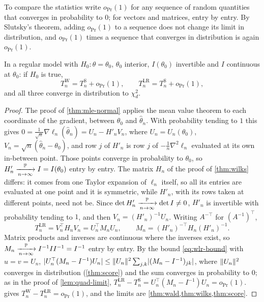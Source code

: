 To compare the statistics write $o_\Pr(1)$ for any sequence of random quantities that converges in probability to $0$; for vectors and matrices, entry by entry.
By Slutsky's theorem, adding $o_\Pr(1)$ to a sequence does not change its limit in distribution, and $o_\Pr(1)$ times a sequence that converges in distribution is again $o_\Pr(1)$.

\begin{theorem}
\label{thm:three-tests}
In a regular model with $H_0: \theta = \theta_0$, $\theta_0$ interior, $I(\theta_0)$ invertible and $I$ continuous at $\theta_0$: if $H_0$ is true,
\[
T^{\mathrm{W}}_n = T^{\mathrm{S}}_n + o_\Pr(1), \qquad T^{\mathrm{LR}}_n = T^{\mathrm{S}}_n + o_\Pr(1),
\]
and all three converge in distribution to $\chi^2_d$.
\end{theorem}

\begin{proof}
The proof of \cref{thm:mle-normal} applies the mean value theorem to each coordinate of the gradient, between $\theta_0$ and $\hat{\theta}_n$.
With probability tending to $1$ this gives $0 = \frac{1}{\sqrt{n}}\nabla\ell_n(\hat{\theta}_n) = U_n - H'_nV_n$, where $U_n = U_n(\theta_0)$, $V_n = \sqrt{n}(\hat{\theta}_n - \theta_0)$, and row $j$ of $H'_n$ is row $j$ of $-\frac1n\nabla^2\ell_n$ evaluated at its own in-between point.
Those points converge in probability to $\theta_0$, so $H'_n \xrightarrow [n \to \infty ]{\mathbb{P}} I = I(\theta_0)$ entry by entry.
The matrix $H_n$ of the proof of \cref{thm:wilks} differs: it comes from one Taylor expansion of $\ell_n$ itself, so all its entries are evaluated at one point and it is symmetric, while $H'_n$, with its rows taken at different points, need not be.
Since $\det H'_n \xrightarrow [n \to \infty ]{\mathbb{P}} \det I \neq 0$, $H'_n$ is invertible with probability tending to $1$, and then $V_n = (H'_n)^{-1}U_n$.
Writing $A^{-\top}$ for $(A^{-1})^\top$,
\[
T^{\mathrm{LR}}_n = V_n^\top H_n V_n = U_n^\top M_n U_n, \qquad M_n = (H'_n)^{-\top}H_n(H'_n)^{-1}.
\]
Matrix products and inverses are continuous where the inverses exist, so $M_n \xrightarrow [n \to \infty ]{\mathbb{P}} I^{-1}II^{-1} = I^{-1}$ entry by entry.
By the bound \eqref{eq:wlr-bound} with $u = v = U_n$, $\lvert U_n^\top(M_n - I^{-1})U_n\rvert \leq \lVert U_n\rVert^2\sum_{j,k}\lvert(M_n - I^{-1})_{jk}\rvert$, where $\lVert U_n\rVert^2$ converges in distribution (\cref{thm:score}) and the sum converges in probability to $0$; as in the proof of \cref{lem:quad-limit}, $T^{\mathrm{LR}}_n - T^{\mathrm{S}}_n = U_n^\top(M_n - I^{-1})U_n = o_\Pr(1)$.
 gives $T^{\mathrm{W}}_n - T^{\mathrm{LR}}_n = o_\Pr(1)$, and the limits are \cref{thm:wald,thm:wilks,thm:score}.
\end{proof}


